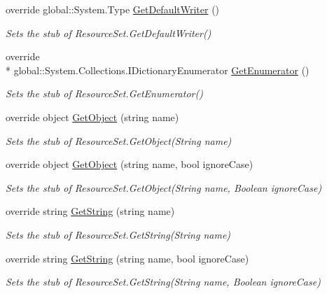 \begin{DoxyCompactItemize}
override global\-::\-System.\-Type \hyperlink{class_system_1_1_resources_1_1_fakes_1_1_stub_resource_set_ac334a2245584ff4f20cdbb271cf87f63}{Get\-Default\-Writer} ()
\begin{DoxyCompactList}\small\item\em Sets the stub of Resource\-Set.\-Get\-Default\-Writer()\end{DoxyCompactList}\item 
override \\*
global\-::\-System.\-Collections.\-I\-Dictionary\-Enumerator \hyperlink{class_system_1_1_resources_1_1_fakes_1_1_stub_resource_set_a62bd25cbe22ea3019bf6864bd5ee9dc7}{Get\-Enumerator} ()
\begin{DoxyCompactList}\small\item\em Sets the stub of Resource\-Set.\-Get\-Enumerator()\end{DoxyCompactList}\item 
override object \hyperlink{class_system_1_1_resources_1_1_fakes_1_1_stub_resource_set_a8571ad8e7ee94b376a11aaeb50b7f219}{Get\-Object} (string name)
\begin{DoxyCompactList}\small\item\em Sets the stub of Resource\-Set.\-Get\-Object(\-String name)\end{DoxyCompactList}\item 
override object \hyperlink{class_system_1_1_resources_1_1_fakes_1_1_stub_resource_set_ae27133ccb5f015dfbc7d31d3b24e70e7}{Get\-Object} (string name, bool ignore\-Case)
\begin{DoxyCompactList}\small\item\em Sets the stub of Resource\-Set.\-Get\-Object(\-String name, Boolean ignore\-Case)\end{DoxyCompactList}\item 
override string \hyperlink{class_system_1_1_resources_1_1_fakes_1_1_stub_resource_set_adaf8465eebba999ae5da085427a25b91}{Get\-String} (string name)
\begin{DoxyCompactList}\small\item\em Sets the stub of Resource\-Set.\-Get\-String(\-String name)\end{DoxyCompactList}\item 
override string \hyperlink{class_system_1_1_resources_1_1_fakes_1_1_stub_resource_set_a55415d0b6f1648588c7ca73eec382359}{Get\-String} (string name, bool ignore\-Case)
\begin{DoxyCompactList}\small\item\em Sets the stub of Resource\-Set.\-Get\-String(\-String name, Boolean ignore\-Case)\end{DoxyCompactList}\end{DoxyCompactItemize}
